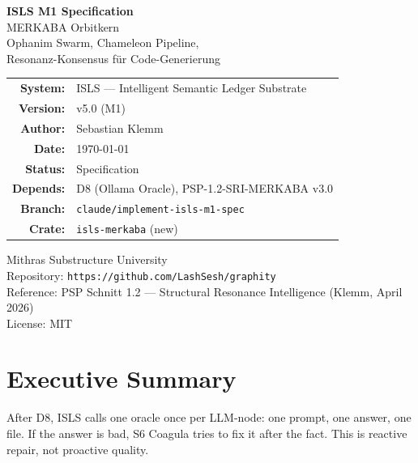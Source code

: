 \documentclass[11pt,a4paper]{article}
\begin{document}
\begin{titlepage}
\centering
\vspace*{2.5cm}

{\Huge\bfseries\color{isls-blue} ISLS M1 Specification}\\[0.5cm]
{\LARGE\color{isls-orange} MERKABA Orbitkern}\\[0.3cm]
{\large\color{isls-gray} Ophanim Swarm, Chameleon Pipeline,\\
Resonanz-Konsensus f\"ur Code-Generierung}\\[2cm]

{\large
\begin{tabular}{rl}
\textbf{System:}       & ISLS --- Intelligent Semantic Ledger Substrate \\
\textbf{Version:}      & v5.0 (M1) \\
\textbf{Author:}       & Sebastian Klemm \\
\textbf{Date:}         & \today \\
\textbf{Status:}       & Specification \\
\textbf{Depends:}      & D8 (Ollama Oracle), PSP-1.2-SRI-MERKABA v3.0 \\
\textbf{Branch:}       & \texttt{claude/implement-isls-m1-spec} \\
\textbf{Crate:}        & \texttt{isls-merkaba} (new) \\
\end{tabular}
}

\vfill

{\small\color{isls-gray}
Mithras Substructure University\\
Repository: \texttt{https://github.com/LashSesh/graphity}\\
Reference: PSP Schnitt 1.2 --- Structural Resonance Intelligence (Klemm, April 2026)\\
License: MIT
}
\end{titlepage}

\tableofcontents
\newpage


\section{Executive Summary}

After D8, ISLS calls one oracle once per LLM-node: one prompt, one 
answer, one file. If the answer is bad, S6 Coagula tries to fix it 
after the fact. This is reactive repair, not proactive quality.
\end{document}
